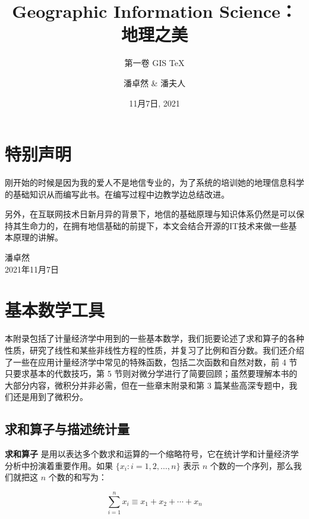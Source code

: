 \documentclass[cn,10pt,math=newtx,citestyle=gb7714-2015,bibstyle=gb7714-2015]{elegantbook}
\title{Geographic Information Science：地理之美}
\subtitle{第一卷 GIS \TeX{}}
\author{潘卓然 \& 潘夫人}
\institute{ 中国地质大学（武汉）}
\date{11月7日, 2021}
\begin{document}
\maketitle
\frontmatter

\chapter*{特别声明}


刚开始的时候是因为我的爱人不是地信专业的，为了系统的培训她的地理信息科学的基础知识从而编写此书。在编写过程中边教学边总结改进。

\vskip 0.5cm

另外，在互联网技术日新月异的背景下，地信的基础原理与知识体系仍然是可以保持其生命力的，在拥有地信基础的前提下，本文会结合开源的IT技术来做一些基本原理的讲解。\cite{en3}

\vskip 0.5cm

\begin{flushright}
潘卓然\\
2021年11月7日
\end{flushright}

\tableofcontents

\mainmatter





% 

\nocite{*} 
\printbibliography[heading=bibliography,title=参考文献]
\appendix

\chapter{基本数学工具}


本附录包括了计量经济学中用到的一些基本数学，我们扼要论述了求和算子的各种性质，研究了线性和某些非线性方程的性质，并复习了比例和百分数。我们还介绍了一些在应用计量经济学中常见的特殊函数，包括二次函数和自然对数，前 4 节只要求基本的代数技巧，第 5 节则对微分学进行了简要回顾；虽然要理解本书的大部分内容，微积分并非必需，但在一些章末附录和第 3 篇某些高深专题中，我们还是用到了微积分。

\section{求和算子与描述统计量}

\textbf{求和算子} 是用以表达多个数求和运算的一个缩略符号，它在统计学和计量经济学分析中扮演着重要作用。如果 $\{x_i: i=1, 2, \ldots, n\}$ 表示 $n$ 个数的一个序列，那么我们就把这 $n$ 个数的和写为：

\begin{equation}
\sum_{i=1}^n x_i \equiv x_1 + x_2 +\cdots + x_n
\end{equation}
\end{document}
